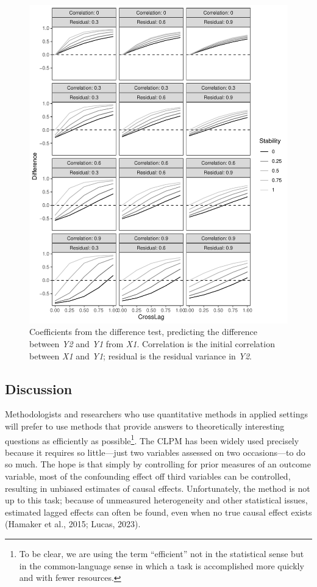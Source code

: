 \documentclass[
  man,mask,floatsintext]{apa6}
\begin{document}
\begin{figure}
\centering
\includegraphics{triangulation_files/figure-latex/sim2-1.pdf}
\caption{\label{fig:sim2}Coefficients from the difference test, predicting the difference between \emph{Y2} and \emph{Y1} from \emph{X1}. Correlation is the initial correlation between \emph{X1} and \emph{Y1}; residual is the residual variance in \emph{Y2}.}
\end{figure}

\subsection{Discussion}\label{discussion}

Methodologists and researchers who use quantitative methods in applied settings will prefer to use methods that provide answers to theoretically interesting questions as efficiently as possible\footnote{To be clear, we are using the term ``efficient'' not in the statistical sense but in the common-language sense in which a task is accomplished more quickly and with fewer resources.}. The CLPM has been widely used precisely because it requires so little---just two variables assessed on two occasions---to do so much. The hope is that simply by controlling for prior measures of an outcome variable, most of the confounding effect off third variables can be controlled, resulting in unbiased estimates of causal effects. Unfortunately, the method is not up to this task; because of unmeasured heterogeneity and other statistical issues, estimated lagged effects can often be found, even when no true causal effect exists (Hamaker et al., 2015; Lucas, 2023).
\end{document}
